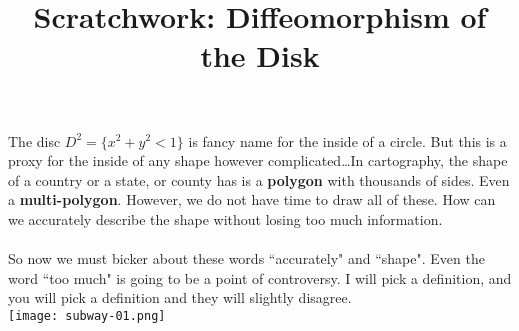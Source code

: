 \documentclass[12pt]{article}
\title{Scratchwork: Diffeomorphism of the Disk}
\date{}
\begin{document}

\sffamily

\maketitle

\noindent The disc $D^2 = \{ x^2 + y^2 < 1 \}$ is fancy name for the inside of a circle.  But this is a proxy for the inside of any shape however complicated\dots In cartography, the shape of a country or a state, or county has is a \textbf{polygon} with thousands of sides.  Even a \textbf{multi-polygon}.  However, we do not have time to draw all of these. How can we accurately describe the shape without losing too much information. \\ \\
So now we must bicker about these words ``accurately" and ``shape".  Even the word ``too much" is going to be a point of controversy.  I will pick a definition, and you will pick a definition and they will slightly disagree.  \\

\noindent \texttt{[image: subway-01.png]} \\
\end{document}

